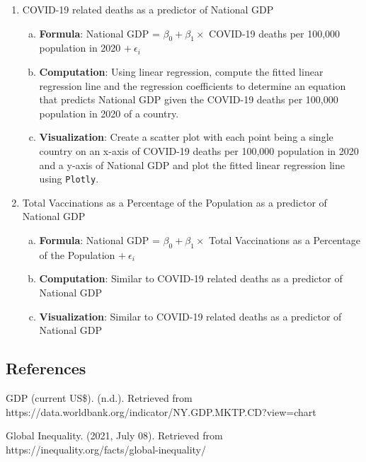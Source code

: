 \documentclass[fontsize=11pt]{article}
\begin{document}
\begin{enumerate}
\begin{enumerate}[(a)]
            \end{enumerate}
        \item COVID-19 related deaths as a predictor of National GDP
            \begin{enumerate}[(a)]
                \item \textbf{Formula}: National GDP = $\beta_{0} + \beta_{1} \times$ COVID-19 deaths per 100,000 population in 2020 $+ \  \epsilon_{i}$
                \item \textbf{Computation}: Using linear regression, compute the fitted linear regression line and the regression coefficients to determine an equation that  predicts National GDP given the COVID-19 deaths per 100,000 population in 2020 of a country.
                \item \textbf{Visualization}: Create a scatter plot with each point being a single country on an x-axis of COVID-19 deaths per 100,000 population in 2020 and a y-axis of National GDP and plot the fitted linear regression line using \texttt{Plotly}.
            \end{enumerate}
        \item Total Vaccinations as a Percentage of the Population as a predictor of National GDP
            \begin{enumerate}[(a)]
                \item \textbf{Formula}: National GDP = $\beta_{0} + \beta_{1} \times$ Total Vaccinations as a Percentage of the Population $+ \ \epsilon_{i}$
                \item \textbf{Computation}: Similar to COVID-19 related deaths as a predictor of National GDP
                \item \textbf{Visualization}: Similar to COVID-19 related deaths as a predictor of National GDP
            \end{enumerate}
    \end{enumerate}
\newpage
\begin{center}
\section*{References}
\end{center}
    \item GDP (current US\$). (n.d.). Retrieved from https://data.worldbank.org/indicator/NY.GDP.MKTP.CD?view=chart\\
    \item Global Inequality. (2021, July 08). Retrieved from https://inequality.org/facts/global-inequality/ \\
\end{document}
